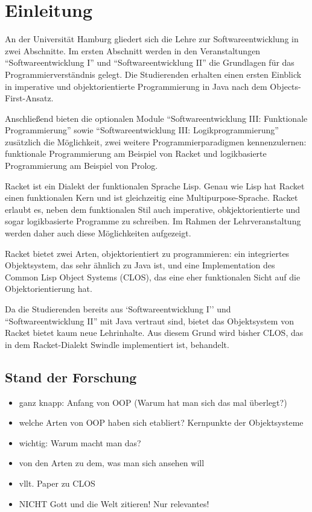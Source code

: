 \chapter{Einleitung} 

An der Universität Hamburg gliedert sich die Lehre zur Softwareentwicklung in zwei Abschnitte. Im ersten Abschnitt werden in den Veranstaltungen ``Softwareentwicklung I'' und ``Softwareentwicklung II'' die Grundlagen für das Programmierverständnis gelegt. Die Studierenden erhalten einen ersten Einblick in imperative und objektorientierte Programmierung in Java nach dem Objects-First-Ansatz.

Anschließend bieten die optionalen Module ``Softwareentwicklung III: Funktionale Programmierung'' sowie ``Softwareentwicklung III: Logikprogrammierung'' zusätzlich die Möglichkeit, zwei weitere  Programmierparadigmen kennenzulernen: funktionale Programmierung am Beispiel von Racket und logikbasierte Programmierung am Beispiel von Prolog.

Racket ist ein Dialekt der funktionalen Sprache Lisp. Genau wie Lisp hat Racket einen funktionalen Kern und ist gleichzeitig eine Mul\-ti\-pur\-pose-Spra\-che. Racket erlaubt es, neben dem funktionalen Stil auch imperative, obkjektorientierte und sogar logikbasierte Programme zu schreiben. Im Rahmen der Lehrveranstaltung werden daher auch diese Möglichkeiten aufgezeigt. 

Racket bietet zwei Arten, objektorientiert zu programmieren: ein integriertes Objektsystem, das sehr ähnlich zu Java ist, und eine Implementation des Common Lisp Object Systems (CLOS), das eine eher funktionalen Sicht auf die Objektorientierung hat. 

Da die Studierenden bereits aus `Softwareentwicklung I'' und ``Softwareentwicklung II'' mit Java vertraut sind, bietet das Objektsystem von Racket bietet kaum neue Lehrinhalte. Aus diesem Grund wird bisher CLOS, das in dem Racket-Dialekt Swindle implementiert ist, behandelt. 

\section{Stand der Forschung} 
\begin{itemize}
 \item ganz knapp: Anfang von OOP (Warum hat man sich das mal überlegt?)
 \item welche Arten von OOP haben sich etabliert? Kernpunkte der Objektsysteme
 \item wichtig: Warum macht man das?
 \item von den Arten zu dem, was man sich ansehen will
 \item vllt. Paper zu CLOS
 \item NICHT Gott und die Welt zitieren! Nur relevantes!
\end{itemize}

